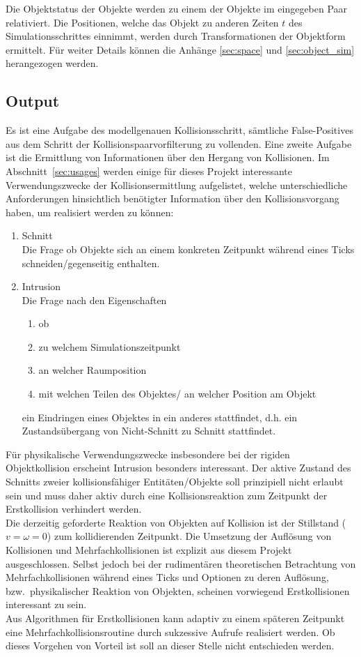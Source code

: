 Die Objektstatus der Objekte werden zu einem der Objekte im eingegeben Paar relativiert.  Die Positionen, welche das Objekt zu anderen Zeiten $t$ des Simulationsschrittes einnimmt, werden durch Transformationen der Objektform ermittelt. Für weiter Details können die Anhänge \ref{sec:space} und \ref{sec:object_sim} herangezogen werden.\\

\subsection{Output}
Es ist eine Aufgabe des modellgenauen Kollisionsschritt, sämtliche False-Positives aus dem Schritt der Kollisionspaarvorfilterung zu vollenden.
Eine zweite Aufgabe ist die Ermittlung von Informationen über den Hergang von Kollisionen.
Im Abschnitt~\ref{sec:usages} werden einige für dieses Projekt interessante Verwendungszwecke der Kollisionsermittlung aufgelistet, welche unterschiedliche Anforderungen hinsichtlich benötigter Information über den Kollisionsvorgang haben, um realisiert werden zu können:
\begin{enumerate}
	\item Schnitt\\
		Die Frage ob Objekte sich an einem konkreten Zeitpunkt während eines Ticks schneiden/gegenseitig enthalten.
	\item Intrusion\\
		Die Frage nach den Eigenschaften
		\begin{enumerate}
		\item ob
		\item zu welchem Simulationszeitpunkt
		\item an welcher Raumposition
		\item mit welchen Teilen des Objektes/ an welcher Position am Objekt
		\end{enumerate}
		ein Eindringen eines Objektes in ein anderes stattfindet, d.h. ein Zustandsübergang von Nicht-Schnitt zu Schnitt stattfindet.
\end{enumerate}
Für physikalische Verwendungszwecke insbesondere bei der rigiden Objektkollision erscheint Intrusion besonders interessant. Der aktive Zustand des Schnitts zweier kollisionsfähiger Entitäten/Objekte soll prinzipiell nicht erlaubt sein und muss daher aktiv durch eine Kollisionsreaktion zum Zeitpunkt der Erstkollision verhindert werden.\\
Die derzeitig geforderte Reaktion von Objekten auf Kollision ist der Stillstand ($v = \omega = 0$) zum kollidierenden Zeitpunkt. Die Umsetzung der Auflösung von Kollisionen und Mehrfachkollisionen ist explizit aus diesem Projekt ausgeschlossen. Selbst jedoch bei der rudimentären theoretischen Betrachtung von Mehrfachkollisionen während eines Ticks und Optionen zu deren Auflösung, bzw.~physikalischer Reaktion von Objekten, scheinen vorwiegend Erstkollisionen interessant zu sein.\\
Aus Algorithmen für Erstkollisionen kann adaptiv zu einem späteren Zeitpunkt eine Mehrfachkollisionsroutine durch sukzessive Aufrufe realisiert werden. Ob dieses Vorgehen von Vorteil ist soll an dieser Stelle nicht entschieden werden.

